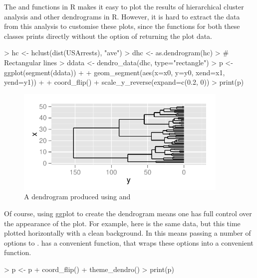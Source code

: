 \documentclass[10pt,oneside]{article}
\begin{document}
The  and  functions in R makes it easy to plot the results of hierarchical cluster analysis and other dendrograms in R.  However, it is hard to extract the data from this analysis to customise these plots, since the  functions for both these classes prints directly without the option of returning the plot data.  

\begin{Schunk}
\begin{Sinput}
> hc <- hclust(dist(USArrests), "ave")
> dhc <- as.dendrogram(hc)
> # Rectangular lines
> ddata <- dendro_data(dhc, type="rectangle")
> p <- ggplot(segment(ddata)) + 
+     geom_segment(aes(x=x0, y=y0, xend=x1, yend=y1)) + 
+     coord_flip() + scale_y_reverse(expand=c(0.2, 0))
> print(p)
\end{Sinput}
\end{Schunk}

\begin{figure}[h]
\begin{center}
\includegraphics[width=4in, height=2in]{ggdendro-dendro1}
\end{center}
\caption{A dendrogram produced using \dendrodata{} and }
\end{figure}


Of course, using ggplot to create the dendrogram means one has full control over the appearance of the plot.  For example, here is the same data, but this time plotted horizontally with a clean background.  In  this means passing a number of options to .  \ggdendro{} has a convenient function,  that wraps these options into a convenient function.

\begin{Schunk}
\begin{Sinput}
> p <- p + coord_flip() + theme_dendro()
> print(p)
\end{Sinput}
\end{Schunk}
\end{document}
